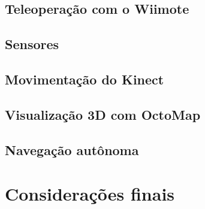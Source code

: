 \documentclass[a4paper,11pt]{article}
\begin{document}
	\subsection{Teleoperação com o Wiimote}
	\label{sec:result:wiiMote}
	
		
		
	\subsection{Sensores}
	\label{sec:result:sensores}
	
			
	
	\subsection{Movimentação do Kinect}
	\label{sec:result:movKinect}
	
			
	
	\subsection{Visualização 3D com OctoMap}
	\label{sec:result:octomap}
		
		
	
	\subsection{Navegação autônoma}
	\label{sec:result:slam}
	
		
 
\section{Considerações finais}
\label{sec:conc}




\end{document}
